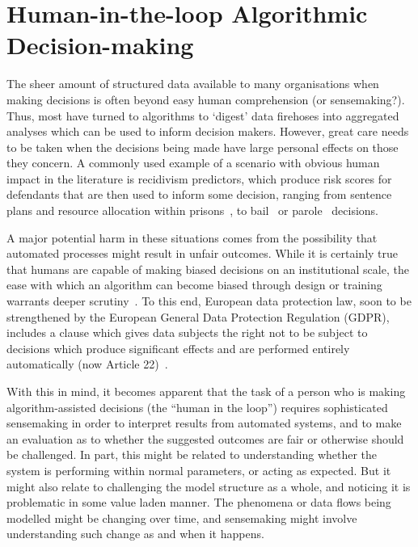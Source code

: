 \documentclass[sigchi-a, authorversion]{acmart}
\begin{document}
\section{Human-in-the-loop Algorithmic Decision-making}


The sheer amount of structured data available to many organisations when making decisions is often beyond easy human comprehension (or sensemaking?). Thus, most have turned to algorithms to `digest' data firehoses into aggregated analyses which can be used to inform decision makers. However, great care needs to be taken when the decisions being made have large personal effects on those they concern. A commonly used example of a scenario with obvious human impact in the literature is recidivism predictors, which produce risk scores for defendants that are then used to inform some decision, ranging from sentence plans and resource allocation within prisons~\cite{mooreOASys}, to bail~\cite{marionHART17} or parole~\cite{propublicamachinebias} decisions.

A major potential harm in these situations comes from the possibility that automated processes might result in unfair outcomes. While it is certainly true that humans are capable of making biased decisions on an institutional scale, the ease with which an algorithm can become biased through design or training warrants deeper scrutiny~\cite{binns2017like}. To this end, European data protection law, soon to be strengthened by the European General Data Protection Regulation (GDPR), includes a clause which gives data subjects the right not to be subject to decisions which produce significant effects and are performed entirely automatically (now Article 22)~\cite{edwardsveale}.

With this in mind, it becomes apparent that the task of a person who is making algorithm-assisted decisions (the ``human in the loop'') requires sophisticated sensemaking in order to interpret results from automated systems, and to make an evaluation as to whether the suggested outcomes are fair or otherwise should be challenged. In part, this might be related to understanding whether the system is performing within normal parameters, or acting as expected. But it might also relate to challenging the model structure as a whole, and noticing it is problematic in some value laden manner. The phenomena or data flows being modelled might be changing over time, and sensemaking might involve understanding such change as and when it happens. 
\end{document}
